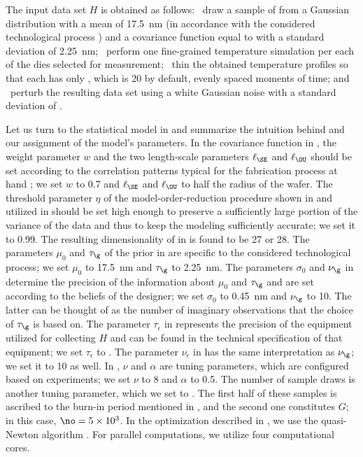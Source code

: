 The input data set $H$ is obtained as follows: \one~draw a sample of \g from a
Gaussian distribution with a mean of 17.5~nm (in accordance with the considered
technological process \cite{ptm}) and a covariance function equal to
 with a standard deviation of 2.25~nm; \two~perform one
fine-grained temperature simulation per each of the \hnd dies selected for
measurement; \three~thin the obtained temperature profiles so that each has only
\ns, which is 20 by default, evenly spaced moments of time; and \four~perturb
the resulting data set using a white Gaussian noise with a standard deviation of
.

Let us turn to the statistical model in  and
summarize the intuition behind and our assignment of the model's parameters. In
the covariance function in , the weight parameter $w$ and
the two length-scale parameters $\ell_\SE$ and $\ell_\OU$ should be set
according to the correlation patterns typical for the fabrication process at
hand \cite{chandrakasan2000, cheng2011}; we set $w$ to 0.7 and $\ell_\SE$ and
$\ell_\OU$ to half the radius of the wafer. The threshold parameter $\eta$ of
the model-order-reduction procedure shown in  and utilized
in  should be set high enough to preserve a sufficiently
large portion of the variance of the data and thus to keep the modeling
sufficiently accurate; we set it to 0.99. The resulting dimensionality \nz of
\vz in  is found to be 27 or 28. The parameters $\mu_0$
and $\tau_\g$ of the prior in  are specific to the considered
technological process; we set $\mu_0$ to 17.5~nm and $\tau_\g$ to 2.25~nm. The
parameters $\sigma_0$ and $\nu_\g$ in  determine the precision
of the information about $\mu_0$ and $\tau_\g$ and are set according to the
beliefs of the designer; we set $\sigma_0$ to 0.45~nm and $\nu_\g$ to 10. The
latter can be thought of as the number of imaginary observations that the choice
of $\tau_\g$ is based on. The parameter $\tau_\epsilon$ in 
represents the precision of the equipment utilized for collecting $H$ and can be
found in the technical specification of that equipment; we set $\tau_\epsilon$
to . The parameter $\nu_\epsilon$ in  has the same
interpretation as $\nu_\g$; we set it to 10 as well. In ,
$\nu$ and $\alpha$ are tuning parameters, which are configured based on
experiments; we set $\nu$ to 8 and $\alpha$ to 0.5. The number of sample draws
is another tuning parameter, which we set to . The first half of
these samples is ascribed to the burn-in period mentioned in
, and the second one constitutes $G$; in this case,
$\no = 5 \times 10^3$. In the optimization described in
, we use the quasi-Newton algorithm \cite{press2007}.
For parallel computations, we utilize four computational cores.

